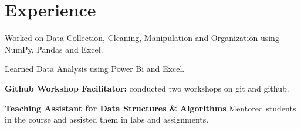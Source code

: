 \documentclass[]{m abbas resume' 2022}
\begin{document}
\hfill
\begin{minipage}[t]{0.45\textwidth} 
    

    
\section{Experience}
\vspace{\topsep} %
\begin{tightemize}
\sectionsep
\item Worked on Data Collection, Cleaning, Manipulation and Organization using
    NumPy, Pandas and Excel.
\end{tightemize}  
  
\begin{tightemize}
\sectionsep
\item Learned Data Analysis using Power Bi and Excel. 
\end{tightemize}

\begin{tightemize}
\item \textbf{Github Workshop Facilitator: }conducted two workshops on git and
    github. %
\item \textbf{Teaching Assistant for Data Structures \& Algorithms} Mentored
    students in the course and assisted them in labs and assignments.

\end{tightemize}  
%
%


\end{minipage}
\end{document}
